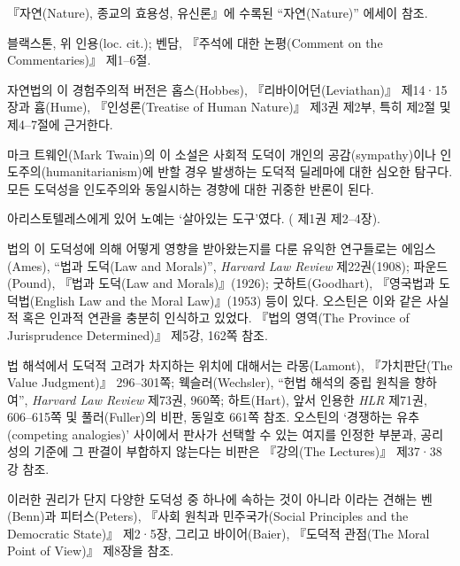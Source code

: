 { 『자연(Nature), 종교의 효용성,
유신론』에 수록된 ``자연(Nature)'' 에세이 참조.

 블랙스톤, 위
인용(loc. cit.); 벤담, 『주석에 대한 논평(Comment on the Commentaries)』
제1--6절.

 자연법의 이 경험주의적 버전은
홉스(Hobbes), 『리바이어던(Leviathan)』 제14·15장과 흄(Hume),
『인성론(Treatise of Human Nature)』 제3권 제2부, 특히 제2절 및
제4--7절에 근거한다.

 마크 트웨인(Mark
Twain)의 이 소설은 사회적 도덕이 개인의 공감(sympathy)이나
인도주의(humanitarianism)에 반할 경우 발생하는 도덕적 딜레마에 대한
심오한 탐구다. 모든 도덕성을 인도주의와 동일시하는 경향에 대한 귀중한
반론이 된다.

 아리스토텔레스에게 있어 노예는 `살아있는
도구'였다. ( 제1권 제2--4장).

 법의 이
도덕성에 의해 어떻게 영향을 받아왔는지를 다룬 유익한 연구들로는
에임스(Ames), ``법과 도덕(Law and Morals)'', \emph{Harvard Law Review}
제22권(1908); 파운드(Pound), 『법과 도덕(Law and Morals)』(1926);
굿하트(Goodhart), 『영국법과 도덕법(English Law and the Moral
Law)』(1953) 등이 있다. 오스틴은 이와 같은 사실적 혹은 인과적 연관을
충분히 인식하고 있었다. 『법의 영역(The Province of Jurisprudence
Determined)』 제5강, 162쪽 참조.

 법 해석에서 도덕적 고려가 차지하는
위치에 대해서는 라몽(Lamont), 『가치판단(The Value Judgment)』
296--301쪽; 웩슬러(Wechsler), ``헌법 해석의 중립 원칙을 향하여'',
\emph{Harvard Law Review} 제73권, 960쪽; 하트(Hart), 앞서 인용한
\emph{HLR} 제71권, 606--615쪽 및 풀러(Fuller)의 비판, 동일호 661쪽
 참조. 오스틴의 `경쟁하는 유추(competing
analogies)' 사이에서 판사가 선택할 수 있는 여지를 인정한 부분과,
공리성의 기준에 그 판결이 부합하지 않는다는 비판은 『강의(The
Lectures)』 제37·38강 참조.

이러한 권리가 단지 다양한 도덕성 중 하나에 속하는 것이 아니라
이라는 견해는
벤(Benn)과 피터스(Peters), 『사회 원칙과 민주국가(Social Principles and
the Democratic State)』 제2·5장, 그리고 바이어(Baier), 『도덕적 관점(The
Moral Point of View)』 제8장을 참조.

}
